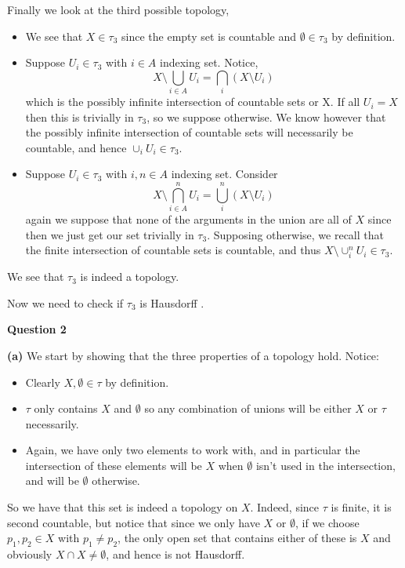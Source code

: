 \documentclass[10pt]{article}
\begin{document}
Finally we look at the third possible topology,
\begin{itemize}
\item We see that $X\in \tau_{3}$ since the empty set is countable and $\emptyset \in \tau_{3}$ by definition.
\item Suppose $U_{i}\in \tau_{3}$ with $i\in A$ indexing set. Notice,
  $$X \setminus \bigcup_{i\in A} U_{i} = \bigcap_{i}\left(X\setminus U_{i}\right)$$
  which is the possibly infinite intersection of countable sets or X. If all $U_{i} = X$ then this is trivially in $\tau_{3}$, so we suppose otherwise. We know however that the possibly infinite intersection of countable sets will necessarily be countable, and hence $\cup_{i}U_{i} \in \tau_{3}$.
\item Suppose $U_{i}\in \tau_{3}$ with $i,n \in A$ indexing set. Consider
  $$X \setminus \bigcap_{i\in A}^{n} U_{i} = \bigcup_{i}^{n}\left(X\setminus U_{i}\right)$$
  again we suppose that none of the arguments in the union are all of $X$ since then we just get our set trivially in $\tau_{3}$. Supposing otherwise, we recall that the finite intersection of countable sets is countable, and thus $X\setminus \cup_{i}^{n}U_{i} \in \tau_{3}$.
\end{itemize}
We see that $\tau_{3}$ is indeed a topology.

Now we need to check if $\tau_{3}$ is Hausdorff .
\newpage

\textbf{Question 2}

\textbf{(a)} We start by showing that the three properties of a topology hold. Notice:
\begin{itemize}
\item Clearly $X,\emptyset \in \tau$ by definition.
\item $\tau$ only contains $X$ and $\emptyset$ so any combination of unions will be either $X$ or $\tau$ necessarily.
\item Again, we have only two elements to work with, and in particular the intersection of these elements will be $X$ when $\emptyset$ isn't used in the intersection, and will be $\emptyset$ otherwise.
\end{itemize}

So we have that this set is indeed a topology on $X$. Indeed, since $\tau$ is finite, it is second countable, but notice that since we only have $X$ or $\emptyset$, if we choose $p_{1},p_{2}\in X$ with $p_{1} \neq p_{2}$, the only open set that contains either of these is $X$ and obviously $X\cap X \neq \emptyset$, and hence is not Hausdorff.
\end{document}
